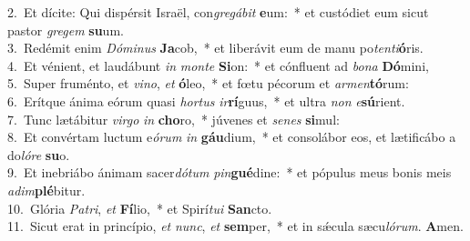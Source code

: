 {2.~}Et dícite: Qui dispérsit Israël, con\textit{gre}\textit{gá}\textit{bit} \textbf{e}um:~* et custódiet eum sicut pastor \textit{gre}\textit{gem} \textbf{su}um.\\
{3.~}Redémit enim \textit{Dó}\textit{mi}\textit{nus} \textbf{Ja}cob,~* et liberávit eum de manu po\textit{ten}\textit{ti}\textbf{ó}ris.\\
{4.~}Et vénient, et laudábunt \textit{in} \textit{mon}\textit{te} \textbf{Si}on:~* et cónfluent ad \textit{bo}\textit{na} \textbf{Dó}mini,\\
{5.~}Super fruménto, et \textit{vi}\textit{no}, \textit{et} \textbf{ó}leo,~* et fœtu pécorum et \textit{ar}\textit{men}\textbf{tó}rum:\\
{6.~}Erítque ánima eórum quasi \textit{hor}\textit{tus} \textit{ir}\textbf{rí}guus,~* et ultra \textit{non} \textit{e}\textbf{sú}rient.\\
{7.~}Tunc lætábitur \textit{vir}\textit{go} \textit{in} \textbf{cho}ro,~* júvenes et \textit{se}\textit{nes} \textbf{si}mul:\\
{8.~}Et convértam luctum e\textit{ó}\textit{rum} \textit{in} \textbf{gáu}dium,~* et consolábor eos, et lætificábo a do\textit{ló}\textit{re} \textbf{su}o.\\
{9.~}Et inebriábo ánimam sacer\textit{dó}\textit{tum} \textit{pin}\textbf{gué}dine:~* et pópulus meus bonis meis \textit{a}\textit{dim}\textbf{plé}bitur.\\
{10.~}Glória \textit{Pa}\textit{tri}, \textit{et} \textbf{Fí}lio,~* et Spirí\textit{tu}\textit{i} \textbf{San}cto.\\
{11.~}Sicut erat in princípio, \textit{et} \textit{nunc}, \textit{et} \textbf{sem}per,~* et in sǽcula sæcu\textit{ló}\textit{rum}. \textbf{A}men.\\
